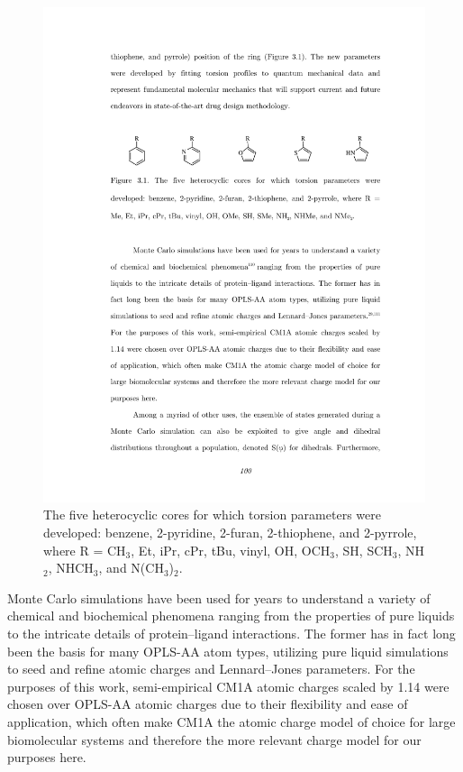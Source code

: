 \documentclass[12pt]{report}
\begin{document}
\begin{figure}[htbp]
\centering
\includegraphics[scale=0.999]{figures/pdf/cycles.pdf}
\caption{The five heterocyclic cores for which torsion parameters were developed: benzene, 2-pyridine, 2-furan, 2-thiophene, and 2-pyrrole, where R = CH$_{3}$, Et, iPr, cPr, tBu, vinyl, OH, OCH$_3$, SH, SCH$_3$, NH$_2$, NHCH$_3$, and N(CH$_3$)$_2$.}
\label{cycles}
\end{figure}

Monte Carlo simulations have been used for years to understand a variety of chemical and biochemical phenomena\cite{kollman} ranging from the properties of pure liquids to the intricate details of protein--ligand interactions. The former has in fact long been the basis for many OPLS-AA atom types, utilizing pure liquid simulations to seed and refine atomic charges and Lennard--Jones parameters.\cite{qiu,briggs} For the purposes of this work, semi-empirical CM1A atomic charges scaled by 1.14 were chosen over OPLS-AA atomic charges due to their flexibility and ease of application, which often make CM1A the atomic charge model of choice for large biomolecular systems and therefore the more relevant charge model for our purposes here. 
\end{document}
